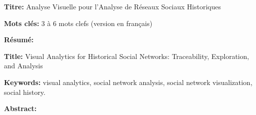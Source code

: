 \documentclass[12pt,a4paper, twoside]{book}
\begin{document}
    \small

    \begin{mdframed}[linecolor=Prune,linewidth=1]

        \textbf{Titre:} Analyse Visuelle pour l'Analyse de Réseaux Sociaux Historiques

        \noindent \textbf{Mots clés:} 3 à 6 mots clefs (version en français)

        \vspace{-.5cm}
        \begin{multicols}{2}
            \noindent \textbf{Résumé:}
        \end{multicols}

    \end{mdframed}

    \vspace{8mm}

    \begin{mdframed}[linecolor=Prune,linewidth=1]

        \textbf{Title:} Visual Analytics for Historical Social Networks: Traceability, Exploration, and Analysis

        \noindent \textbf{Keywords:} visual analytics, social network analysis, social network visualization, social history.

            \noindent \textbf{Abstract:} 
    \end{mdframed}

    \titleformat{\chapter}[hang]{\bfseries\LARGE\color{Prune}}{\thechapter\quad}{.1ex}{}{}%
    \titlespacing{\chapter}{0pc}{0ex}{0.5pc}
\end{document}
